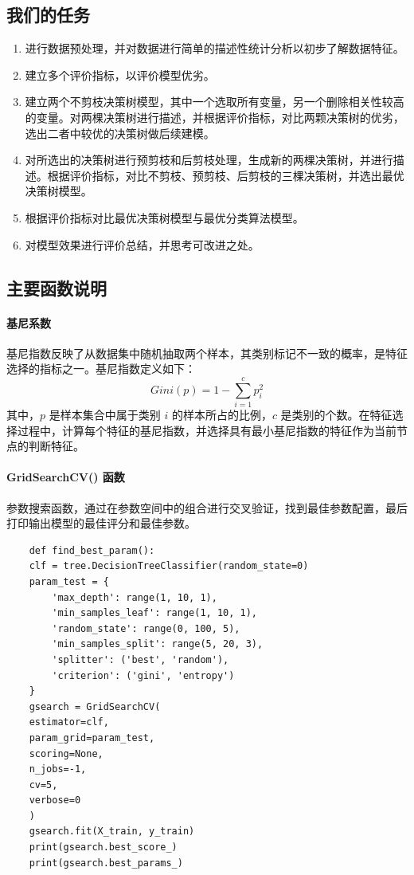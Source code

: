 \documentclass[a4paper,12pt,onecolumn,oneside]{article}
\begin{document}
\subsection{我们的任务}
\begin{enumerate}
	\item 进行数据预处理，并对数据进行简单的描述性统计分析以初步了解数据特征。
	\item 建立多个评价指标，以评价模型优劣。
	\item 建立两个不剪枝决策树模型，其中一个选取所有变量，另一个删除相关性较高的变量。对两棵决策树进行描述，并根据评价指标，对比两颗决策树的优劣，选出二者中较优的决策树做后续建模。
	\item 对所选出的决策树进行预剪枝和后剪枝处理，生成新的两棵决策树，并进行描述。根据评价指标，对比不剪枝、预剪枝、后剪枝的三棵决策树，并选出最优决策树模型。
	\item 根据评价指标对比最优决策树模型与最优分类算法模型。
	\item 对模型效果进行评价总结，并思考可改进之处。
\end{enumerate}
\subsection{主要函数说明}
\paragraph{基尼系数} 
	基尼指数反映了从数据集中随机抽取两个样本，其类别标记不一致的概率，是特征选择的指标之一。基尼指数定义如下： 
	\begin{equation*}
		Gini(p) = 1 - \sum_{i=1}^{c} p_i^2
	\end{equation*}
	其中，$p$ 是样本集合中属于类别 $i$ 的样本所占的比例，$c$ 是类别的个数。在特征选择过程中，计算每个特征的基尼指数，并选择具有最小基尼指数的特征作为当前节点的判断特征。
\paragraph{GridSearchCV() 函数}
	参数搜索函数，通过在参数空间中的组合进行交叉验证，找到最佳参数配置，最后打印输出模型的最佳评分和最佳参数。
\lstset{language=Python}
\lstset{frame=lines}
\lstset{basicstyle=\footnotesize}
\begin{lstlisting}
	def find_best_param():
	clf = tree.DecisionTreeClassifier(random_state=0)
	param_test = {
		'max_depth': range(1, 10, 1),
		'min_samples_leaf': range(1, 10, 1),
		'random_state': range(0, 100, 5),
		'min_samples_split': range(5, 20, 3),
		'splitter': ('best', 'random'),
		'criterion': ('gini', 'entropy')
	}
	gsearch = GridSearchCV(
	estimator=clf, 
	param_grid=param_test, 
	scoring=None, 
	n_jobs=-1, 
	cv=5, 
	verbose=0
	)
	gsearch.fit(X_train, y_train)
	print(gsearch.best_score_)
	print(gsearch.best_params_)
\end{lstlisting}
\newpage
\end{document}
